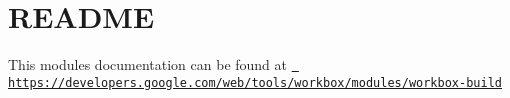 \chapter{README}
\hypertarget{md_pkiclassroomrescheduler_2src_2main_2frontend_2node__modules_2workbox-build_2_r_e_a_d_m_e}{}\label{md_pkiclassroomrescheduler_2src_2main_2frontend_2node__modules_2workbox-build_2_r_e_a_d_m_e}
This module\textquotesingle{}s documentation can be found at \href{https://developers.google.com/web/tools/workbox/modules/workbox-build}{\texttt{ https\+://developers.\+google.\+com/web/tools/workbox/modules/workbox-\/build}} 